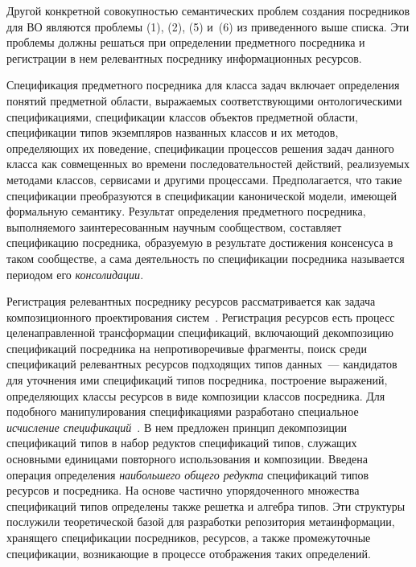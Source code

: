 \begin{multicols}{2}
     Другой конкретной совокупностью семантических проблем создания посредников
для ВО являются проблемы (1), (2), (5) и~(6) из приведенного выше списка. Эти проблемы
должны решаться при определении предметного посредника и регистрации в нем
релевантных посреднику информационных ресурсов.

     Спецификация предметного посредника для класса задач включает определения
понятий предметной области, выражаемых соответствующими онтологическими
спецификациями, спецификации классов объектов предметной области, спецификации
типов экземпляров названных классов и их методов, определяющих их поведение,
спецификации процессов решения задач данного класса как совмещенных во времени
последовательностей действий, реализуемых методами классов, сервисами и другими
процессами. Предполагается, что такие спецификации преобразуются в спецификации
канонической модели, имеющей формальную семантику. Результат определения
предметного посредника, выполняемого заинтересованным научным сообществом,
составляет спецификацию посредника, образуемую в результате достижения консенсуса в
таком сообществе, а сама деятельность по спецификации посредника называется
периодом его \textit{консолидации}.

     Регистрация релевантных посреднику ресурсов рассматривается как задача
композиционного проектирования систем~\cite{Briu98, Briu01}. Регистрация ресурсов %
есть процесс целенаправленной трансформации спецификаций, включающий
декомпозицию спецификаций посредника на непротиворечивые фрагменты, поиск среди
спецификаций релевантных ресурсов подходящих типов данных~--- кандидатов для
уточнения ими спецификаций типов посредника, построение выражений, опре\-де\-ля\-ющих
классы ресурсов в виде композиции классов посредника. Для подобного манипулирования
спецификациями разработано специальное \textit{исчисление спецификаций}~\cite{Kla99}.
В нем предложен принцип декомпозиции спецификаций типов в набор редуктов
спецификаций типов, служащих основными единицами повторного использования и
композиции. Введена операция определения \textit{наибольшего общего редукта}
спецификаций типов ресурсов и посредника. На основе частично упорядоченного
множества спецификаций типов определены также решетка и алгебра типов. Эти
структуры послужили тео\-ретиче\-ской базой для разработки репозитория метаин\-фор\-ма\-ции,
хранящего спецификации посредников, ресурсов, а также промежуточные спецификации,
возникающие в процессе отображения таких определений.


\end{multicols}
